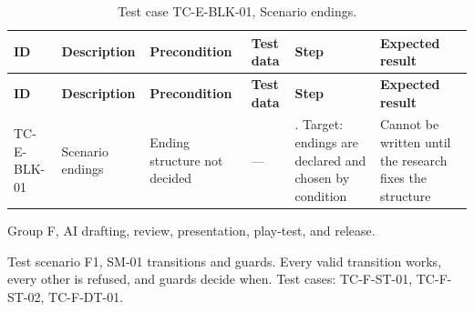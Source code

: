 {\footnotesize{}\renewcommand{\arraystretch}{1.1}
\begin{longtable}{|>{\raggedright\arraybackslash}p{}|>{\raggedright\arraybackslash}p{}|>{\raggedright\arraybackslash}p{}|>{\raggedright\arraybackslash}p{}|>{\raggedright\arraybackslash}p{}|>{\raggedright\arraybackslash}p{}|}
\caption{Test case TC-\allowbreak{}E-\allowbreak{}BLK-\allowbreak{}01, Scenario endings.} \\
\hline
\textbf{ID} & \textbf{Description} & \textbf{Precondition} & \textbf{Test data} & \textbf{Step} & \textbf{Expected result} \\ \hline
\endfirsthead
\hline
\textbf{ID} & \textbf{Description} & \textbf{Precondition} & \textbf{Test data} & \textbf{Step} & \textbf{Expected result} \\ \hline
\endhead
TC-E-BLK-01 & Scenario endings & Ending structure not decided & --- & 1. Target: endings are declared and chosen by condition & Cannot be written until the research fixes the structure \\ \hline
\end{longtable}
}

Group F, AI drafting, review, presentation, play-test, and release.

Test scenario F1, SM-01 transitions and guards. Every valid transition works, every other is refused, and guards decide when. Test cases: TC-F-ST-01, TC-F-ST-02, TC-F-DT-01.

